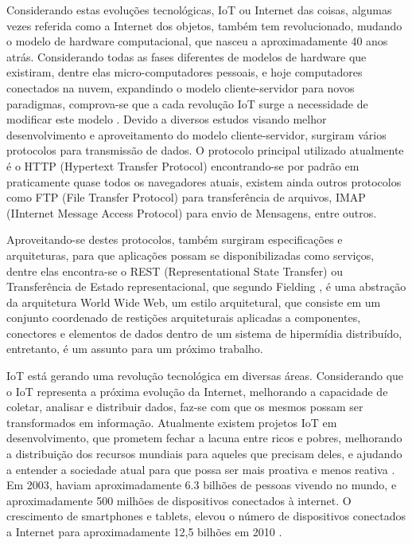 \documentclass[journal]{IEEEtran}
\begin{document}
Considerando estas evoluções tecnológicas, IoT ou Internet das coisas, algumas vezes referida como a Internet dos objetos, também tem revolucionado, mudando o modelo de hardware computacional, que nasceu a aproximadamente 40 anos atrás. Considerando todas as fases diferentes de modelos de hardware que existiram, dentre elas micro-computadores pessoais, e hoje computadores conectados na nuvem,  expandindo o modelo cliente-servidor para novos paradigmas, comprova-se que a cada revolução IoT surge a necessidade de modificar este modelo \cite[p.~6]{dzonevoltreeiot}. Devido a diversos estudos visando melhor desenvolvimento e aproveitamento do modelo cliente-servidor, surgiram vários protocolos para transmissão de dados. O protocolo principal utilizado atualmente é o HTTP (Hypertext Transfer Protocol) encontrando-se por padrão em praticamente quase todos os navegadores atuais, existem ainda outros protocolos como FTP (File Transfer Protocol) para transferência de arquivos, IMAP (IInternet Message Access Protocol) para envio de Mensagens, entre outros. 

Aproveitando-se destes protocolos, também surgiram especificações e arquiteturas, para que aplicações possam se disponibilizadas como serviços, dentre elas encontra-se o REST (Representational State Transfer) ou Transferência de Estado representacional, que segundo Fielding \cite{roythomasfielding2017}, é uma abstração da arquitetura World Wide Web, um estilo  arquitetural, que consiste em um conjunto coordenado de restições arquiteturais aplicadas a componentes, conectores e elementos de dados dentro de um sistema de hipermídia distribuído, entretanto, é um assunto para um próximo trabalho.

IoT está gerando uma revolução tecnológica em diversas áreas. Considerando que o IoT representa a próxima evolução da Internet, melhorando a capacidade de coletar, analisar e distribuir dados, faz-se com que os mesmos possam ser transformados em informação. Atualmente existem projetos IoT em desenvolvimento, que prometem fechar a lacuna entre ricos e pobres, melhorando a distribuição dos recursos mundiais para aqueles que precisam deles, e ajudando a entender a sociedade atual para que possa ser mais proativa e menos reativa \cite[p.~2]{Evans}. Em 2003, haviam aproximadamente 6.3 bilhões de pessoas vivendo no mundo, e aproximadamente 500 milhões de dispositivos conectados à internet. O crescimento de smartphones e tablets, elevou o número de dispositivos conectados a Internet para aproximadamente 12,5 bilhões em 2010 \cite[p.~3]{Evans}.
\end{document}
